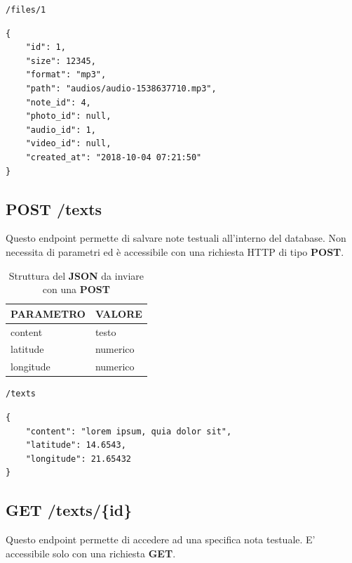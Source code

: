 \begin{lstlisting}[caption=Esempio di chiamata, xleftmargin=.3\textwidth, xrightmargin=.3\textwidth]
	/files/1
\end{lstlisting}
\pagebreak
\begin{lstlisting}[caption=Esempio \textbf{JSON} restituito]
{
	"id": 1,
	"size": 12345,
	"format": "mp3",
	"path": "audios/audio-1538637710.mp3",
	"note_id": 4,
	"photo_id": null,
	"audio_id": 1,
	"video_id": null,
	"created_at": "2018-10-04 07:21:50"
}
\end{lstlisting}

\subsection{POST /texts}
Questo endpoint permette di salvare note testuali all'interno del database. Non necessita di parametri ed è accessibile con una richiesta HTTP di tipo \textbf{POST}.\\

\begin{table}[!h]
	\centering
	\begin{tabular}{@{}ll@{}}
		\toprule
		\textbf{PARAMETRO} & \textbf{VALORE}  \\ \midrule
		content            & testo\\ 
		latitude           & numerico\\ 
		longitude          & numerico\\ \bottomrule		
	\end{tabular}
\caption{Struttura del \textbf{JSON} da inviare con una \textbf{POST}}
\end{table}

\begin{lstlisting}[caption=Esempio di \textbf{POST}, xleftmargin=.32\textwidth, xrightmargin=.32\textwidth]
	/texts	
\end{lstlisting}

\begin{lstlisting}[caption=Esempio \textbf{JSON} da inviare]
{
	"content": "lorem ipsum, quia dolor sit",
	"latitude": 14.6543,
	"longitude": 21.65432
}
\end{lstlisting}

\subsection{GET /texts/\{id\}}
Questo endpoint permette di accedere ad una specifica nota testuale. E' accessibile solo con una richiesta \textbf{GET}.

